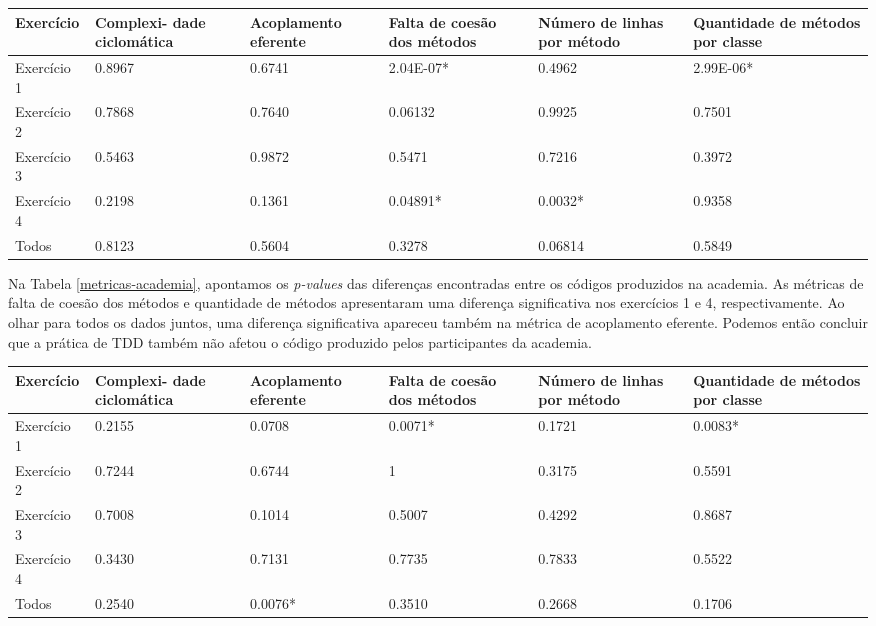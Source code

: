 \documentclass[conference]{IEEEtran}
\begin{document}
\begin{table*}
	\centering
	\begin{tabular}{ | p{3cm} | p{2cm} | p{2cm} | p{2cm} | p{2cm} | p{2cm} |}
		\hline
		Exercício & Complexi- dade ciclomática & Acoplamento eferente & Falta de coesão dos métodos & Número de linhas por método 
		& Quantidade de métodos por classe \\
		\hline
		Exercício 1 &	0.8967	&	0.6741 &	\cellcolor[gray]{0.8}2.04E-07* &	0.4962 &	\cellcolor[gray]{0.8}2.99E-06* \\
		Exercício 2	& 0.7868	&	0.7640 &	0.06132 &	0.9925 &	0.7501 \\
		Exercício 3	& 0.5463	&	0.9872 &	0.5471 &	0.7216 &	0.3972\\
		Exercício 4	& 0.2198	&	0.1361 &	\cellcolor[gray]{0.8}0.04891* &	\cellcolor[gray]{0.8}0.0032* &	0.9358\\
		\hline
		Todos &	0.8123	&	0.5604 &	0.3278 &	0.06814 &	0.5849\\
		\hline
	\end{tabular}
	\caption{\textit{P-values} encontrados para a diferença entre códigos com e sem TDD na indústria}
	\label{metricas-industria}
\end{table*}

Na Tabela \ref{metricas-academia}, apontamos os \textit{p-values} das diferenças encontradas
entre os códigos produzidos na academia. As métricas de 
falta de coesão dos métodos e quantidade de métodos apresentaram
uma diferença significativa nos exercícios 1 e 4, respectivamente.
Ao olhar para todos os dados juntos, uma diferença significativa
apareceu também na métrica de acoplamento eferente.
Podemos então concluir que a prática de TDD também não afetou
o código produzido pelos participantes da academia.

\begin{table*}
	\centering
	\begin{tabular}{ | p{3cm} | p{2cm} | p{2cm} | p{2cm} | p{2cm} | p{2cm} |}
		\hline
		Exercício & Complexi- dade ciclomática & Acoplamento eferente & Falta de coesão dos métodos & Número de linhas por método 
		& Quantidade de métodos por classe \\
		\hline
			Exercício 1	& 0.2155	&	0.0708	& \cellcolor[gray]{0.8}0.0071* &	0.1721	& \cellcolor[gray]{0.8}0.0083*\\
			Exercício 2	& 0.7244	&	0.6744	& 1 &	0.3175 &	0.5591\\
			Exercício 3	& 0.7008	&	0.1014 &	0.5007	& 0.4292	& 0.8687\\
			Exercício 4	& 0.3430	&	0.7131 &	0.7735	& 0.7833	& 0.5522\\
		\hline
			Todos &	0.2540	&	\cellcolor[gray]{0.8}0.0076* & 0.3510 & 0.2668 & 0.1706\\
		\hline
	\end{tabular}
	\caption{\textit{P-values} encontrados para a diferença entre códigos com e sem TDD na academia}
	\label{metricas-academia}
\end{table*}
\end{document}
